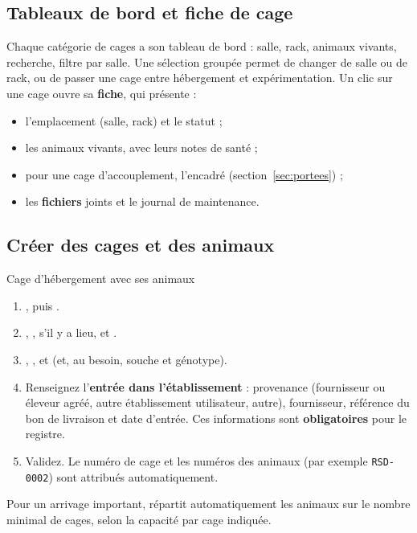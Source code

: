 \documentclass[11pt,a4paper]{article}
\begin{document}
\subsection{Tableaux de bord et fiche de cage}
Chaque catégorie de cages a son tableau de bord : salle, rack, animaux
vivants, recherche, filtre par salle. Une sélection groupée permet de changer
de salle ou de rack, ou de passer une cage entre hébergement et
expérimentation. Un clic sur une cage ouvre sa \textbf{fiche}, qui présente :
\begin{itemize}
  \item l'emplacement (salle, rack) et le statut ;
  \item les animaux vivants, avec leurs notes de santé ;
  \item pour une cage d'accouplement, l'encadré 
    (section~\ref{sec:portees}) ;
  \item les \textbf{fichiers} joints et le journal de maintenance.
\end{itemize}

\subsection{Créer des cages et des animaux}
\begin{procedure}{Cage d'hébergement avec ses animaux}
\begin{enumerate}
  \item {}, puis .
  \item {}, ,  s'il y a
    lieu,  et .
  \item {}, ,  et
     (et, au besoin, souche et génotype).
  \item Renseignez l'\textbf{entrée dans l'établissement} : provenance
    (fournisseur ou éleveur agréé, autre établissement utilisateur, autre),
    fournisseur, référence du bon de livraison et date d'entrée. Ces
    informations sont \textbf{obligatoires} pour le registre.
  \item Validez. Le numéro de cage et les numéros des animaux (par exemple
    \texttt{RSD-0002}) sont attribués automatiquement.
\end{enumerate}
\end{procedure}
Pour un arrivage important,  répartit automatiquement les animaux sur le nombre minimal de cages,
selon la capacité par cage indiquée.
\end{document}
